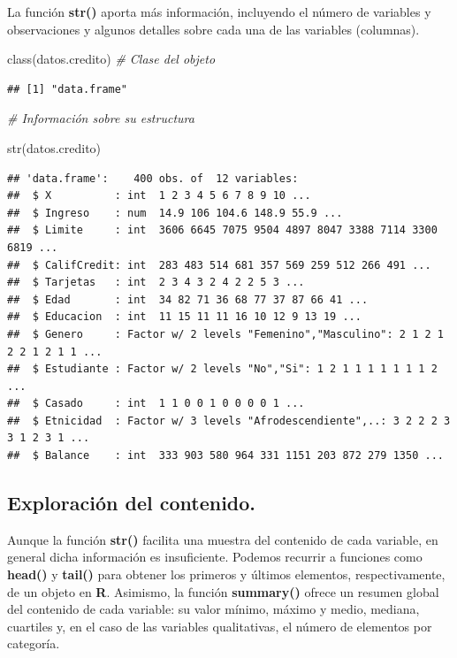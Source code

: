\documentclass[
  12pt,
]{book}
\newenvironment{Shaded}{\begin{snugshade}}{\end{snugshade}}
\newcommand{\CommentTok}[1]{\textcolor[rgb]{0.56,0.35,0.01}{\textit{#1}}}
\newcommand{\FunctionTok}[1]{\textcolor[rgb]{0.00,0.00,0.00}{#1}}
\newcommand{\NormalTok}[1]{#1}
\begin{document}
La función \textbf{str()} aporta más información, incluyendo el número de variables y observaciones y algunos detalles
sobre cada una de las variables (columnas).

\begin{Shaded}
\begin{Highlighting}[]
\FunctionTok{class}\NormalTok{(datos.credito) }\CommentTok{\# Clase del objeto}
\end{Highlighting}
\end{Shaded}

\begin{verbatim}
## [1] "data.frame"
\end{verbatim}

\begin{Shaded}
\begin{Highlighting}[]
\CommentTok{\# Información sobre su estructura}

\FunctionTok{str}\NormalTok{(datos.credito)}
\end{Highlighting}
\end{Shaded}

\begin{verbatim}
## 'data.frame':    400 obs. of  12 variables:
##  $ X          : int  1 2 3 4 5 6 7 8 9 10 ...
##  $ Ingreso    : num  14.9 106 104.6 148.9 55.9 ...
##  $ Limite     : int  3606 6645 7075 9504 4897 8047 3388 7114 3300 6819 ...
##  $ CalifCredit: int  283 483 514 681 357 569 259 512 266 491 ...
##  $ Tarjetas   : int  2 3 4 3 2 4 2 2 5 3 ...
##  $ Edad       : int  34 82 71 36 68 77 37 87 66 41 ...
##  $ Educacion  : int  11 15 11 11 16 10 12 9 13 19 ...
##  $ Genero     : Factor w/ 2 levels "Femenino","Masculino": 2 1 2 1 2 2 1 2 1 1 ...
##  $ Estudiante : Factor w/ 2 levels "No","Si": 1 2 1 1 1 1 1 1 1 2 ...
##  $ Casado     : int  1 1 0 0 1 0 0 0 0 1 ...
##  $ Etnicidad  : Factor w/ 3 levels "Afrodescendiente",..: 3 2 2 2 3 3 1 2 3 1 ...
##  $ Balance    : int  333 903 580 964 331 1151 203 872 279 1350 ...
\end{verbatim}

\hypertarget{exploraciuxf3n-del-contenido.}{%
\subsection{\texorpdfstring{\textbf{Exploración del contenido}.}{Exploración del contenido.}}\label{exploraciuxf3n-del-contenido.}}

Aunque la función \textbf{str()} facilita una muestra del contenido de cada variable, en
general dicha información es insuficiente. Podemos recurrir a funciones
como \textbf{head()} y \textbf{tail()} para obtener los primeros y últimos elementos, respectivamente, de un objeto en \textbf{R}. Asimismo, la función \textbf{summary()} ofrece un resumen global del contenido de cada variable: su valor mínimo, máximo y medio, mediana, cuartiles
y, en el caso de las variables qualitativas, el número de elementos por categoría.
\end{document}
